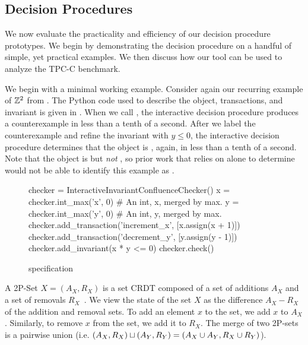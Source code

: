 \subsection{Decision Procedures}
We now evaluate the practicality and efficiency of our decision procedure
prototypes. We begin by demonstrating the decision procedure on a handful of
simple, yet practical examples. We then discuss how our tool can be used to
analyze the TPC-C benchmark.

\example[$\ints^2$]
We begin with a minimal working example. Consider again our recurring example
of $\ints^2$ from . The Python code used to describe the object,
transactions, and invariant is given in . When we call
, the interactive decision procedure produces a
counterexample in less than a tenth of a second.  After we label the
counterexample and refine the invariant with $y \leq 0$, the interactive
decision procedure determines that the object is \invariantconfluent{}, again, in
less than a tenth of a second. Note that the object is \invariantconfluent{} but
\emph{not} \invariantclosed{}, so prior work that relies on \invariantclosure{}
alone to determine \invariantconfluence{} would not be able to identify this
example as \invariantconfluent{}.

\begin{figure}[ht]
  \begin{Python}[gobble=4]
    checker = InteractiveInvariantConfluenceChecker()
    x = checker.int_max('x', 0) # An int, x, merged by max.
    y = checker.int_max('y', 0) # An int, y, merged by max.
    checker.add_transaction('increment_x', [x.assign(x + 1)])
    checker.add_transaction('decrement_y', [y.assign(y - 1)])
    checker.add_invariant(x * y <= 0)
    checker.check()
  \end{Python}
  \caption{ specification}
\end{figure}

A 2P-Set $X = (A_X, R_X)$ is a set CRDT composed of a set of additions $A_X$
and a set of removals $R_X$~\cite{shapiro2011comprehensive}. We view the state
of the set $X$ as the difference $A_X - R_X$ of the addition and removal sets.
To add an element $x$ to the set, we add $x$ to $A_X$. Similarly, to remove $x$
from the set, we add it to $R_X$. The merge of two 2P-sets is a pairwise union
(i.e. $(A_X, R_X) \sqcup (A_Y, R_Y) = (A_X \cup A_Y, R_X \cup R_Y)$).

